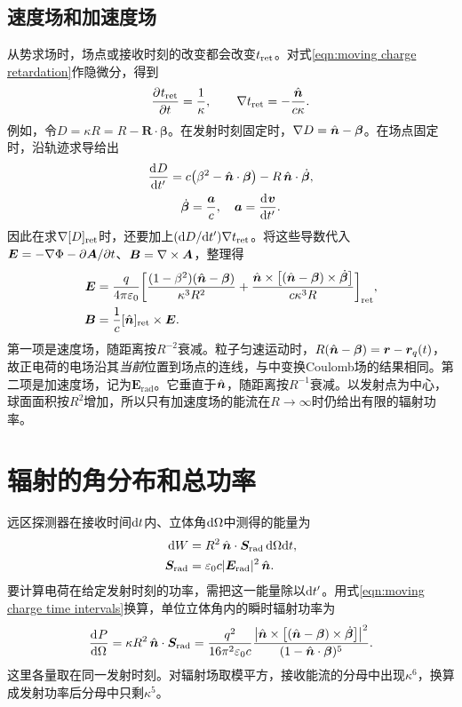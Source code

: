 \subsection{速度场和加速度场}

从势求场时，场点或接收时刻的改变都会改变$t_{\mathrm{ret}}$。对式\eqref{eqn:moving charge retardation}作隐微分，得到
\begin{equation}
    \label{eq:ed-retarded-time-derivatives}
    \frac{\partial^{}t_{\mathrm{ret}}}{\partial{t}^{}} = \frac1\kappa,\qquad
    \nabla t_{\mathrm{ret}} = -\frac{\mathop{}\!\hat{\bm{n}}}{c\kappa}.
\end{equation}
例如，令$D = \kappa R = R - \bm R \cdot \bm\beta$。在发射时刻固定时，$\nabla D = \mathop{}\!\hat{\bm{n}} - \bm\beta$。在场点固定时，沿轨迹求导给出
\begin{gather*}
    \frac{\mathop{}\!\mathrm{d}^{}D}{\mathrm{d}{t'}^{}} = c\bigl(\beta^2 - \mathop{}\!\hat{\bm{n}} \cdot \bm\beta\bigr) - R\mathop{}\!\hat{\bm{n}} \cdot \dot{\bm{\beta}},\\
    \dot{\bm{\beta}} = \frac{\bm a}c,\quad \bm a = \frac{\mathop{}\!\mathrm{d}^{}\bm v}{\mathrm{d}{t'}^{}}.
\end{gather*}
因此在求$\nabla[D]_{\mathrm{ret}}$时，还要加上$(\mathop{}\!\mathrm{d} D/\mathrm{d} t')\nabla t_{\mathrm{ret}}$。将这些导数代入$\bm E = -\nabla\Phi - \partial\bm A/\partial t$、$\bm B = \nabla\times\bm A$，整理得
\begin{align}
    \bm E &= \frac{q}{4\pi\varepsilon_0}
    \biggl[\frac{(1 - \beta^2)(\mathop{}\!\hat{\bm{n}} - \bm\beta)}{\kappa^3 R^2}
    + \frac{\mathop{}\!\hat{\bm{n}} \times \bigl[(\mathop{}\!\hat{\bm{n}} - \bm\beta) \times \dot{\bm{\beta}}\bigr]}{c\kappa^3 R}\biggr]_{\mathrm{ret}},
    \label{eqn:moving charge fields}\\
    \bm B &= \frac1c[\mathop{}\!\hat{\bm{n}}]_{\mathrm{ret}} \times \bm E.\notag
\end{align}
第一项是速度场，随距离按$R^{-2}$衰减。粒子匀速运动时，$R(\mathop{}\!\hat{\bm{n}} - \bm\beta) = \bm r - \bm r_q(t)$，故正电荷的电场沿其\emph{当前}位置到场点的连线，与中变换Coulomb场的结果相同。第二项是加速度场，记为$\bm E_\mathrm{rad}$。它垂直于$\mathop{}\!\hat{\bm{n}}$，随距离按$R^{-1}$衰减。以发射点为中心，球面面积按$R^2$增加，所以只有加速度场的能流在$R \to \infty$时仍给出有限的辐射功率。

\section{辐射的角分布和总功率}

远区探测器在接收时间$\mathop{}\!\mathrm{d} t$内、立体角$\mathop{}\!\mathrm{d}\Omega$中测得的能量为
\begin{align*}
    \mathop{}\!\mathrm{d} W &= R^2\mathop{}\!\hat{\bm{n}} \cdot \bm S_\mathrm{rad}\mathop{}\!\mathrm{d}\Omega\mathrm{d} t,\\
    \bm S_\mathrm{rad} &= \varepsilon_0 c\lvert\bm E_\mathrm{rad}\rvert^2\mathop{}\!\hat{\bm{n}}.
\end{align*}
要计算电荷在给定发射时刻的功率，需把这一能量除以$\mathop{}\!\mathrm{d} t'$。用式\eqref{eqn:moving charge time intervals}换算，单位立体角内的瞬时辐射功率为
\begin{equation}
    \frac{\mathop{}\!\mathrm{d}^{}P}{\mathrm{d}{\Omega}^{}} = \kappa R^2\mathop{}\!\hat{\bm{n}} \cdot \bm S_\mathrm{rad}
    = \frac{q^2}{16\pi^2\varepsilon_0 c}
    \frac{\bigl\lvert\mathop{}\!\hat{\bm{n}} \times \bigl[(\mathop{}\!\hat{\bm{n}} - \bm\beta) \times \dot{\bm{\beta}}\bigr]\bigr\rvert^2}{(1 - \mathop{}\!\hat{\bm{n}} \cdot \bm\beta)^5}.
    \label{eqn:moving charge angular power}
\end{equation}
这里各量取在同一发射时刻。对辐射场取模平方，接收能流的分母中出现$\kappa^6$，换算成发射功率后分母中只剩$\kappa^5$。

